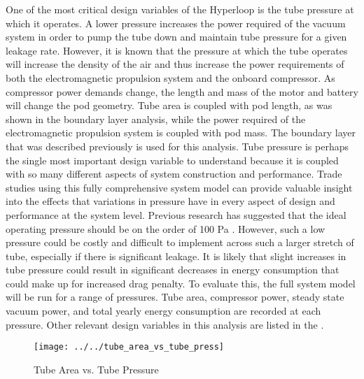 One of the most critical design variables of the Hyperloop is the tube pressure at which it operates. A lower pressure increases the power required of the vacuum system in order to pump the tube down and maintain tube pressure for a given leakage rate. However, it is known that the pressure at which the tube operates will increase the density of the air and thus increase the power requirements of both the electromagnetic propulsion system and the onboard compressor. As compressor power demands change, the length and mass of the motor and battery will change the pod geometry. Tube area is coupled with pod length, as was shown in the boundary layer analysis, while the power required of the electromagnetic propulsion system is coupled with pod mass. The boundary layer that was described previously is used for this analysis. Tube pressure is perhaps the single most important design variable to understand because it is coupled with so many different aspects of system construction and performance. Trade studies using this fully comprehensive system model can provide valuable insight into the effects that variations in pressure have in every aspect of design and performance at the system level.
Previous research has suggested that the ideal operating pressure should be on the order of 100 Pa \cite{Musk, Chin}. However, such a low pressure could be costly and difficult to implement across such a larger stretch of tube, especially if there is significant leakage. It is likely that slight increases in tube pressure could result in significant decreases in energy consumption that could make up for increased drag penalty. To evaluate this, the full system model will be run for a range of pressures. Tube area, compressor power, steady state vacuum power, and total yearly energy consumption are recorded at each pressure. Other relevant design variables in this analysis are listed in the .
\begin{table}
	\centering
	\caption{FIX THIS}
	\label{tbl:FIX_THIS}
\end{table}
\begin{figure}
	\centering
	\texttt{[image: ../../tube\_area\_vs\_tube\_press]}
	\caption{Tube Area vs. Tube Pressure}
	\label{fig:tube_area_vs_tube_press}
\end{figure}
